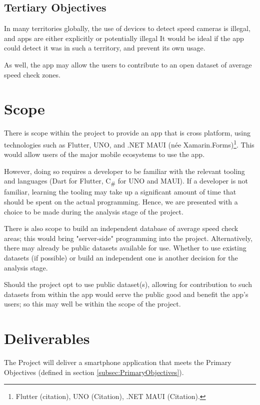 \documentclass[11pt, a4paper, notitlepage]{report}
\begin{document}
\subsection{Tertiary Objectives}
In many territories globally, the use of devices to detect speed cameras is 
illegal, and apps are either explicitly or potentially illegal %
It would be ideal if the app could detect it was in such a territory, and 
prevent its own usage.

As well, the app may allow the users to contribute to an open dataset of 
average speed check zones.

\section{Scope}\label{sec:Scope}
There is scope within the project to provide an app that is cross platform, 
using technologies such as Flutter, UNO, and .NET MAUI (née 
Xamarin.Forms)\footnote{Flutter (citation), UNO (Citation), .NET MAUI 
(Citation).}. This would allow users of the major mobile ecosystems to use the 
app. 

However, doing so requires a developer to be familiar with the relevant tooling 
and languages (Dart for Flutter, C\textsubscript{\#} for UNO and MAUI). If a 
developer is not familiar, learning the tooling may take up a significant 
amount of time that should be spent on the actual programming. Hence, we are 
presented with a choice to be made during the analysis stage of the project.

There is also scope to build an independent database of average speed check 
areas; this would bring "server-side" programming into the project. 
Alternatively, there may already be public datasets available for use. Whether 
to use existing datasets (if possible) or build an independent one is another 
decision for the analysis stage. 

Should the project opt to use public dataset(s), allowing for contribution to 
such datasets from within the app would serve the public good and benefit the 
app's users; so this may well be within the scope of the project.

\section{Deliverables}
The Project will deliver a smartphone application that meets the Primary 
Objectives (defined in section \ref{subsec:PrimaryObjectives}).
\end{document}
